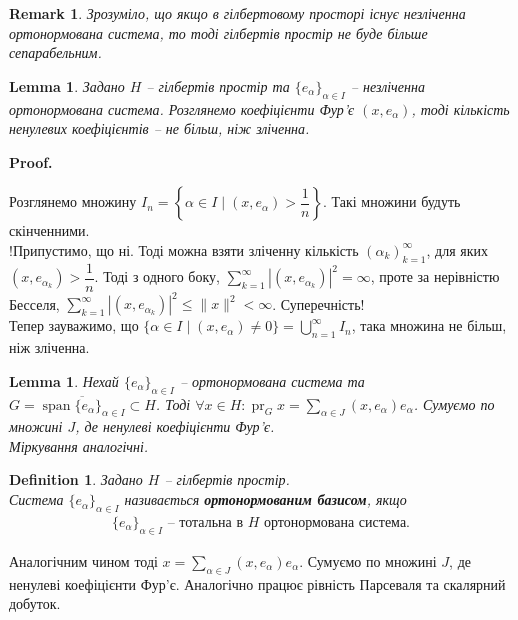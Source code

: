 \documentclass[a4paper, 10pt]{article}
\makeatletter
\theoremstyle{theoremdd}
\theoremstyle{theoremdd}
\newtheorem{definition}[theorem]{Definition}
\theoremstyle{theoremdd}
\theoremstyle{theoremdd}
\theoremstyle{theoremdd}
\theoremstyle{theoremdd}
\newtheorem{remark}[theorem]{Remark}
\theoremstyle{theoremdd}
\newtheorem{lemma}[theorem]{Lemma}
\theoremstyle{theoremdd}
\DeclareMathOperator{\pr}{pr}
\renewenvironment{proof}[1][Proof.\\]{\par
\pushQED{\hfill \qed}%
\normalfont \topsep6\p@\@plus6\p@\relax
\trivlist
\item\relax
{\bfseries
#1\@addpunct{.}}\hspace\labelsep\ignorespaces
}{%
\popQED\endtrivlist\@endpefalse
}
\DeclareMathOperator{\linspan}{span}
\makeatother
\begin{document}
\begin{remark}
Зрозуміло, що якщо в гілбертовому просторі існує незліченна ортонормована система, то тоді гілбертів простір не буде більше сепарабельним.
\end{remark}

\begin{lemma}
Задано $H$ -- гілбертів простір та $\{e_\alpha\}_{\alpha \in I}$ -- незліченна ортонормована система. Розглянемо коефіцієнти Фур'є $(x,e_\alpha)$, тоді кількість ненулевих коефіцієнтів -- не більш, ніж зліченна.
\end{lemma}

\begin{proof}
Розглянемо множину $I_n = \left\{ \alpha \in I \mid (x,e_\alpha) > \dfrac{1}{n} \right\}$. Такі множини будуть скінченними.\\
!Припустимо, що ні. Тоді можна взяти зліченну кількість $(\alpha_k)_{k=1}^\infty$, для яких $(x,e_{\alpha_k}) > \dfrac{1}{n}$. Тоді з одного боку, $\displaystyle\sum_{k=1}^\infty |(x,e_{\alpha_k})|^2 = \infty$, проте за нерівністю Бесселя, $\displaystyle\sum_{k=1}^\infty |(x,e_{\alpha_k})|^2 \leq \|x\|^2 < \infty$. Суперечність!\\
Тепер зауважимо, що $\{\alpha \in I \mid (x,e_\alpha) \neq 0\} = \displaystyle\bigcup_{n=1}^\infty I_n$, така множина не більш, ніж зліченна.
\end{proof}

\begin{lemma}
Нехай $\{e_\alpha\}_{\alpha \in I}$ -- ортонормована система та $G = \overline{\linspan\{e_\alpha\}_{\alpha \in I}} \subset H$. Тоді $\forall x \in H: \pr_G x = \displaystyle\sum_{\alpha \in J}(x,e_\alpha) e_\alpha$. Сумуємо по множині $J$, де ненулеві коефіцієнти Фур'є.\\
\textit{Міркування аналогічні.}
\end{lemma}

\begin{definition}
Задано $H$ -- гілбертів простір.\\
Система $\{e_\alpha\}_{\alpha \in I}$ називається \textbf{ортонормованим базисом}, якщо
\begin{align*}
\{e_\alpha\}_{\alpha \in I} \text{ -- тотальна в $H$ ортонормована система}.
\end{align*}
\end{definition}
Аналогічним чином тоді $x = \displaystyle\sum_{\alpha \in J} (x,e_\alpha) e_\alpha$. Сумуємо по множині $J$, де ненулеві коефіцієнти Фур'є. Аналогічно працює рівність Парсеваля та скалярний добуток.
\end{document}
